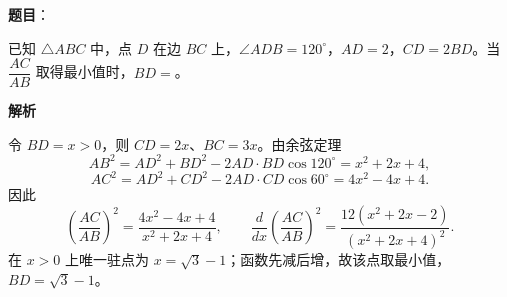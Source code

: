 \begin{answer}

\textbf{题目}：

已知 $\triangle ABC$ 中，点 $D$ 在边 $BC$ 上，$\angle ADB=120^\circ$，$AD=2$，$CD=2BD$。当 $\dfrac{AC}{AB}$ 取得最小值时，$BD=$\gkblank{}。

\textbf{解析}

令 $BD=x>0$，则 $CD=2x$、$BC=3x$。由余弦定理
\nopagebreak[4]
\[
AB^2=AD^2+BD^2-2AD\cdot BD\cos120^\circ=x^2+2x+4,
\]
\nopagebreak[4]
\[
AC^2=AD^2+CD^2-2AD\cdot CD\cos60^\circ=4x^2-4x+4.
\]
因此
\nopagebreak[4]
\[
\left(\frac{AC}{AB}\right)^2=\frac{4x^2-4x+4}{x^2+2x+4},\qquad
\frac{d}{dx}\left(\frac{AC}{AB}\right)^2=\frac{12(x^2+2x-2)}{(x^2+2x+4)^2}.
\]
在 $x>0$ 上唯一驻点为 $x=\sqrt3-1$；函数先减后增，故该点取最小值，$BD=\sqrt3-1$。


\end{answer}

